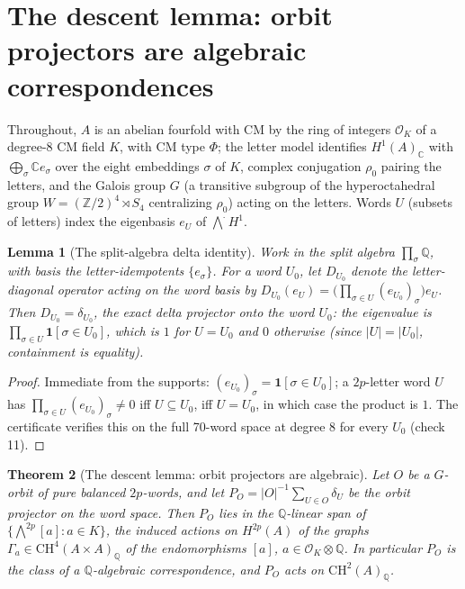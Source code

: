 \documentclass[11pt]{article}
\newtheorem{theorem}{Theorem}
\newtheorem{lemma}[theorem]{Lemma}
\begin{document}
\section{The descent lemma: orbit projectors are algebraic correspondences}

Throughout, $A$ is an abelian fourfold with CM by the ring of integers $\mathcal{O}_K$ of a
degree-8 CM field $K$, with CM type $\Phi$; the letter model identifies $H^1(A)_\mathbb{C}$ with
$\bigoplus_\sigma \mathbb{C} e_\sigma$ over the eight embeddings $\sigma$ of $K$, complex
conjugation $\rho_0$ pairing the letters, and the Galois group $G$ (a transitive subgroup of the
hyperoctahedral group $W = (\mathbb{Z}/2)^4 \rtimes S_4$ centralizing $\rho_0$) acting on the
letters.  Words $U$ (subsets of letters) index the eigenbasis $e_U$ of $\bigwedge^{\cdot} H^1$.

\begin{lemma}[The split-algebra delta identity]\label{lem:delta}
Work in the split algebra $\prod_\sigma \mathbb{Q}$, with basis the letter-idempotents
$\{e_\sigma\}$.  For a word $U_0$, let $D_{U_0}$ denote the letter-diagonal operator acting on
the word basis by $D_{U_0}(e_U) = \bigl(\prod_{\sigma \in U} (e_{U_0})_\sigma\bigr) e_U$.  Then
$D_{U_0} = \delta_{U_0}$, the exact delta projector onto the word $U_0$: the eigenvalue is
$\prod_{\sigma\in U} \mathbf{1}[\sigma \in U_0]$, which is $1$ for $U = U_0$ and $0$ otherwise
(since $|U| = |U_0|$, containment is equality).
\end{lemma}

\begin{proof}
Immediate from the supports: $(e_{U_0})_\sigma = \mathbf{1}[\sigma \in U_0]$; a $2p$-letter word
$U$ has $\prod_{\sigma \in U}(e_{U_0})_\sigma \neq 0$ iff $U \subseteq U_0$, iff $U = U_0$,
in which case the product is $1$.  The certificate verifies this on the full 70-word space at
degree 8 for every $U_0$ (check 11).
\end{proof}

\begin{theorem}[The descent lemma: orbit projectors are algebraic]\label{thm:descent}
Let $O$ be a $G$-orbit of pure balanced $2p$-words, and let
$P_O = |O|^{-1} \sum_{U \in O} \delta_U$ be the orbit projector on the word space.  Then $P_O$
lies in the $\mathbb{Q}$-linear span of $\{\bigwedge^{2p}[a] : a \in K\}$, the induced actions on
$H^{2p}(A)$ of the graphs $\Gamma_a \in \mathrm{CH}^{4}(A \times A)_\mathbb{Q}$ of the
endomorphisms $[a]$, $a \in \mathcal{O}_K \otimes \mathbb{Q}$.  In particular $P_O$ is the class
of a $\mathbb{Q}$-algebraic correspondence, and $P_O$ acts on $\mathrm{CH}^2(A)_\mathbb{Q}$.
\end{theorem}
\end{document}
